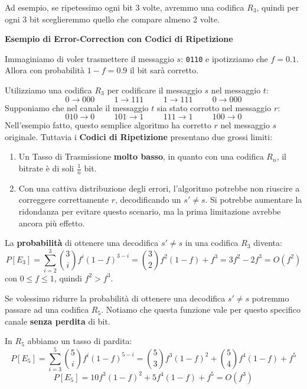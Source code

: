 Ad esempio, se ripetessimo ogni bit 3 volte, avremmo una codifica $R_3$, quindi per ogni 3 bit sceglieremmo quello che compare almeno 2 volte.

\textbf{Esempio di Error-Correction con Codici di Ripetizione}

Immaginiamo di voler trasmettere il messaggio $s$: \verb|0110| e ipotizziamo che $f = 0.1$.\\Allora con probabilità $1-f=0.9$ il bit sarà corretto.

Utilizziamo una codifica $R_3$ per codificare il messaggio $s$ nel messaggio $t$:
$$
0 \rightarrow 000 \hspace{1cm} 1 \rightarrow 111\hspace{1cm} 1 \rightarrow 111 \hspace{1cm}0 \rightarrow 000
$$
Supponiamo che nel canale il messaggio $t$ sia stato corrotto nel messaggio $r$:
$$
010 \rightarrow 0 \hspace{1cm} 101 \rightarrow 1\hspace{1cm} 111 \rightarrow 1 \hspace{1cm}100 \rightarrow 0
$$
Nell'esempio fatto, questo semplice algoritmo ha corretto $r$ nel messaggio $s$ originale. Tuttavia i \textbf{Codici di Ripetizione} presentano due grossi limiti:
\begin{enumerate}
	\item Un Tasso di Trasmissione \textbf{molto basso}, in quanto con una codifica $R_n$, il bitrate è di soli $\frac{1}{n}$ bit.
	\item Con una cattiva distribuzione degli errori, l'algoritmo potrebbe non riuscire a correggere correttamente $r$, decodificando un $s'\neq s$. Si potrebbe aumentare la ridondanza per evitare questo scenario, ma la prima limitazione avrebbe ancora più effetto. 
\end{enumerate}

La \textbf{probabilità} di ottenere una decodifica $s'\neq s$ in una codifica $R_3$ diventa: 
$$P[E_3] = \sum^{3}_{i=2} \binom{3}{i} f^i(1-f)^{3-i}=\binom{3}{2}f^2(1-f)+f^3 = 3f^2-2f^3=O(f^2)$$
con $0\leq f \leq1$, quindi $f^2 > f^3$.

Se volessimo ridurre la probabilità di ottenere una decodifica $s'\neq s$ potremmo passare ad una codifica $R_5$. Notiamo che questa funzione vale per questo specifico canale \textbf{senza perdita} di bit.

\newpage
In $R_5$ abbiamo un tasso di pardita:
$$
P[E_5]=\sum^{5}_{i=3} \binom{5}{i}f^i(1-f)^{5-i} = \binom{5}{3} f^3(1-f)^2 + \binom{5}{4} f^4(1-f) + f^5
$$
$$
P[E_5]= 10f^3 (1-f)^2 + 5f^4(1-f) + f^5 = O(f^3)
$$

